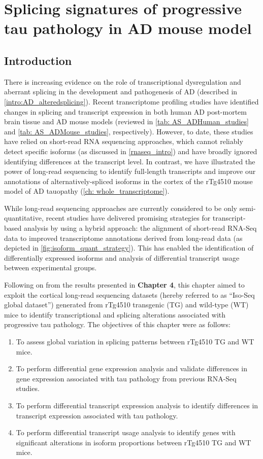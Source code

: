 \cleardoublepage
\chapter{Splicing signatures of progressive tau pathology in AD mouse model}\label{ch: transcriptional_global_differences}

\section{Introduction}
There is increasing evidence on the role of transcriptional dysregulation and aberrant splicing in the development and pathogenesis of AD (described in \cref{intro:AD_alteredsplicing}). Recent transcriptome profiling studies have identified changes in splicing and transcript expression in both human AD post-mortem brain tissue and AD mouse models (reviewed in \cref{tab: AS_ADHuman_studies} and \cref{tab: AS_ADMouse_studies}, respectively). However, to date, these studies have relied on short-read RNA sequencing approaches, which cannot reliably detect specific isoforms (as discussed in \cref{rnaseq_intro}) and have broadly ignored identifying differences at the transcript level. In contrast, we have illustrated the power of long-read sequencing to identify full-length transcripts and improve our annotations of alternatively-spliced isoforms in the cortex of the rTg4510 mouse model of AD tauopathy (\cref{ch: whole_transcriptome}). 

While long-read sequencing approaches are currently considered to be only semi-quantitative, recent studies have delivered promising strategies for transcript-based analysis by using a hybrid approach\cite{Tseng2021}: the alignment of short-read RNA-Seq data to improved transcriptome annotations derived from long-read data (as depicted in \cref{fig:isoform_quant_strategy}). This has enabled the identification of differentially expressed isoforms and analysis of differential transcript usage between experimental groups\cite{Tseng2021}. 

Following on from the results presented in \textbf{Chapter 4}, this chapter aimed to exploit the cortical long-read sequencing datasets (hereby referred to as “Iso-Seq global dataset”) generated from rTg4510 transgenic (TG) and wild-type (WT) mice to identify transcriptional and splicing alterations associated with progressive tau pathology. The objectives of this chapter were as follows: 
\begin{enumerate}
	\item To assess global variation in splicing patterns between rTg4510 TG and WT mice.
	\item To perform differential gene expression analysis and validate differences in gene expression associated with tau pathology from previous RNA-Seq studies. 
	\item To perform differential transcript expression analysis to identify differences in transcript expression associated with tau pathology.   
	\item To perform differential transcript usage analysis to identify genes with significant alterations in isoform proportions between rTg4510 TG and WT mice. 
\end{enumerate} 

